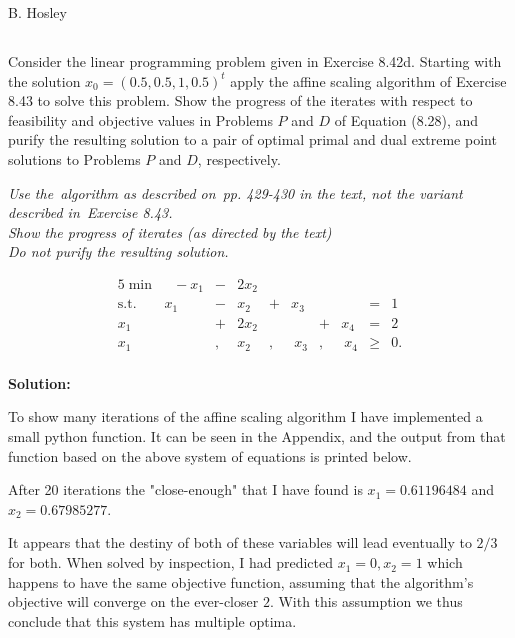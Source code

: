 \documentclass[12pt]{amsart}
\begin{document}
\raggedbottom

\hspace{\fill} {\large B. Hosley}
\bigskip


\setcounter{section}{8}
\setcounter{subsection}{43}
\subsection{}
Consider the linear programming problem given in Exercise 8.42d. 
Starting with the solution \(x_0 = (0.5, 0.5, 1, 0.5)^t\) 
apply the affine scaling algorithm of Exercise 8.43 to solve this problem. 
Show the progress of the iterates with respect to feasibility and 
objective values in Problems \(P\) and \(D\) of Equation (8.28), and 
purify the resulting solution to a pair of optimal primal and dual extreme point 
solutions to Problems \(P\) and \(D\), respectively. 

\noindent
\textit{Use the algorithm as described on pp. 429-430 in the text, not the variant described in Exercise 8.43. \\
Show the progress of iterates (as directed by the text) \\
Do not purify the resulting solution.}

\bigskip

\begin{alignat*}{5}
	\min \quad\   -x_1 & - & 2x_2 &  \\
	\text{s.t.}\qquad 
	x_1 & - &  x_2 & + & x_3 &   &     & = & 1 \\
	x_1 & + & 2x_2 &   &     & + & x_4 & = & 2 \\
	x_1 & , &  x_2 & ,&\ x_3 &, &\ x_4 & \geq & 0. \\
\end{alignat*}

\textbf{Solution:}

To show many iterations of the affine scaling algorithm I have implemented
a small python function. It can be seen in the Appendix, and the output
from that function based on the above system of equations is printed below.

After 20 iterations the "close-enough" that I have found is
\(x_1=0.61196484 \) and
\(x_2=0.67985277 \).

It appears that the destiny of both of these variables will lead eventually to
\(2/3\) for both. When solved by inspection, I had predicted \(x_1=0, x_2=1\)
which happens to have the same objective function, assuming that the algorithm's
objective will converge on the ever-closer \(2\). With this assumption we
thus conclude that this system has multiple optima.
\end{document}
